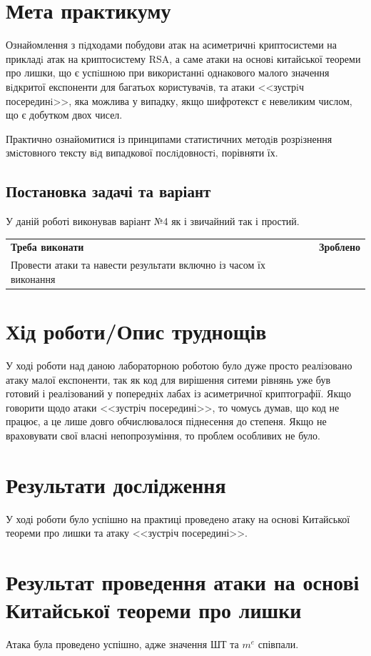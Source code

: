 \section{Мета практикуму}

Ознайомлення з пiдходами побудови атак на асиметричнi криптосистеми на прикладi атак на криптосистему RSA, а саме атаки на основi китайської теореми про лишки, що є успiшною при використаннi однакового малого  значення вiдкритої експоненти для багатьох користувачiв, та атаки <<зустрiч посерединi>>, яка можлива у випадку, якщо шифротекст є невеликим числом, що є добутком двох чисел.

Практично ознайомитися із принципами статистичних методiв розрiзнення змiстовного тексту вiд випадкової послiдовностi, порівняти їх.

\subsection{Постановка задачі та варіант}
У даній роботі виконував варіант №4 як і звичайний так і простий.


\begin{tabularx}{\textwidth}{X|X}
	\textbf{Треба виконати} & \textbf{Зроблено} \\
	Провести атаки та навести результати включно із часом їх виконання & \checkmark \\
\end{tabularx}


\section{Хід роботи/Опис труднощів}
    У ході роботи над даною лабораторною роботою було дуже просто реалізовано атаку малої експоненти, так як код для вирішення ситеми рівнянь уже був готовий і реалізований у попередніх лабах із асиметричної криптографії. Якщо говорити щодо атаки <<зустріч посередині>>, то чомусь думав, що код не працює, а це лише довго обчислювалося піднесення до степеня. Якщо не враховувати свої власні непопрозуміння, то проблем особливих не було.

\section{Результати дослідження}
У ході роботи було успішно на практиці проведено атаку на основі Китайської теореми про лишки та атаку <<зустріч посередині>>.

\section{Результат проведення атаки на основі Китайської теореми про лишки}
Атака була проведено успішно, адже значення ШТ та $m^e$ співпали.

